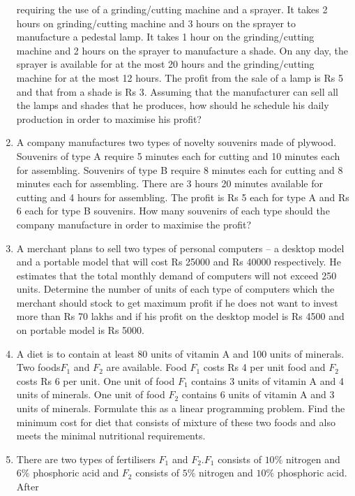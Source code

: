 \begin{enumerate}[label=\arabic*.,ref=\thesubsection.\theenumi]
requiring the use of a grinding/cutting machine and a sprayer. It takes 2 hours on
grinding/cutting machine and 3 hours on the sprayer to manufacture a pedestal
lamp. It takes 1 hour on the grinding/cutting machine and 2 hours on the sprayer
to manufacture a shade. On any day, the sprayer is available for at the most 20
hours and the grinding/cutting machine for at the most 12 hours. The profit from
the sale of a lamp is Rs 5 and that from a shade is Rs 3. Assuming that the
manufacturer can sell all the lamps and shades that he produces, how should he
schedule his daily production in order to maximise his profit?\\
\item A company manufactures two types of novelty souvenirs made of plywood.
Souvenirs of type A require 5 minutes each for cutting and 10 minutes each for
assembling. Souvenirs of type B require 8 minutes each for cutting and 8 minutes
each for assembling. There are 3 hours 20 minutes available for cutting and 4
hours for assembling. The profit is Rs 5 each for type A and Rs 6 each for type
B souvenirs. How many souvenirs of each type should the company manufacture
in order to maximise the profit?\\
\item A merchant plans to sell two types of personal computers – a desktop model and
a portable model that will cost Rs 25000 and Rs 40000 respectively. He estimates
that the total monthly demand of computers will not exceed 250 units. Determine
the number of units of each type of computers which the merchant should stock
to get maximum profit if he does not want to invest more than Rs 70 lakhs and if
his profit on the desktop model is Rs 4500 and on portable model is Rs 5000.\\
\item A diet is to contain at least 80 units of vitamin A and 100 units of minerals. Two
foods$ F_{1}$ and $F_{2}$ are available. Food $F_{1}$ costs Rs 4 per unit food and $F_{2}$ costs
Rs 6 per unit. One unit of food $F_{1}$ contains 3 units of vitamin A and 4 units of
minerals. One unit of food $F_{2}$ contains 6 units of vitamin A and 3 units of minerals.
Formulate this as a linear programming problem. Find the minimum cost for diet
that consists of mixture of these two foods and also meets the minimal nutritional
requirements.\\
\item There are two types of fertilisers $F_{1}$ and $F_{2}$.$F_{1}$ consists of $10\%$ nitrogen and $6\%$
phosphoric acid and $F_{2}$ consists of $5\%$ nitrogen and $10\%$ phosphoric acid. After

\end{enumerate}
